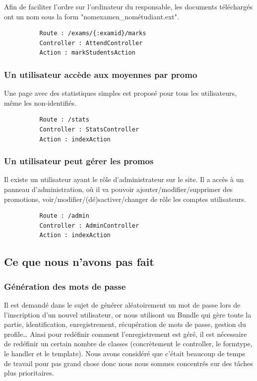\documentclass{report}
\begin{document}
        Afin de faciliter l'ordre sur l'ordinateur du responsable, les documents
        téléchargés ont un nom sous la form "nomexamen\_nométudiant.ext".

        \begin{verbatim}
          Route : /exams/{:examid}/marks
          Controller : AttendController
          Action : markStudentsAction
        \end{verbatim}
      \subsubsection{Un utilisateur accède aux moyennes par promo}
        Une page avec des statistiques simples est proposé pour tous les utilisateurs,
        même les non-identifiés.

        \begin{verbatim}
          Route : /stats
          Controller : StatsController
          Action : indexAction
        \end{verbatim}
      \subsubsection{Un utilisateur peut gérer les promos}
        Il existe un utilisateur ayant le rôle d'administrateur sur le site. Il
        a accès à un panneau d'administration, où il va pouvoir 
        ajouter/modifier/supprimer des promotions, voir/modifier/(dé)sactiver/changer de rôle
        les comptes utilisateurs.

        \begin{verbatim}
          Route : /admin
          Controller : AdminController
          Action : indexAction
        \end{verbatim}
    \subsection{Ce que nous n'avons pas fait}
      \subsubsection{Génération des mots de passe}
        Il est demandé dans le sujet de générer aléatoirement un mot de passe lors 
        de l'inscription d'un nouvel utilisateur, or nous utilisont un Bundle qui 
        gère toute la partie, identification, enregistrement, récupération de mots
        de passe, gestion du profile… Ainsi pour redéfinir comment l'enregistrement
        est géré, il est nécessaire de redéfinir un certain nombre de classes
        (concrètement le controller, le formtype, le handler et le template). Nous
        avons considéré que c'était beaucoup de temps de travail pour pas grand
        chose donc nous nous sommes concentrés sur des tâches plus prioritaires.
\end{document}
